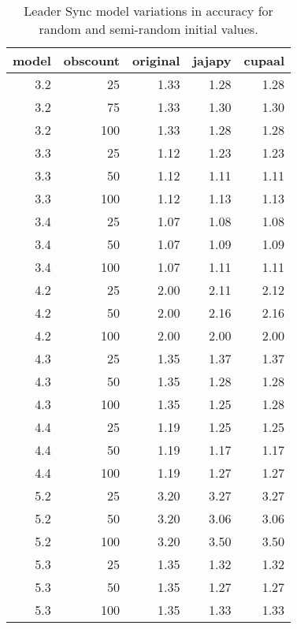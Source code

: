 \begin{table}
    \centering
    \caption{Leader Sync model variations in accuracy for random and semi-random initial values.}
    \label{tab:leader_results_accuracy}
    \begin{tabular}{rrrrr}
        \toprule
        model & obscount & original & jajapy & cupaal \\
        \midrule
        3.2   & 25       & 1.33     & 1.28   & 1.28   \\
        3.2   & 75       & 1.33     & 1.30   & 1.30   \\
        3.2   & 100      & 1.33     & 1.28   & 1.28   \\
        3.3   & 25       & 1.12     & 1.23   & 1.23   \\
        3.3   & 50       & 1.12     & 1.11   & 1.11   \\
        3.3   & 100      & 1.12     & 1.13   & 1.13   \\
        3.4   & 25       & 1.07     & 1.08   & 1.08   \\
        3.4   & 50       & 1.07     & 1.09   & 1.09   \\
        3.4   & 100      & 1.07     & 1.11   & 1.11   \\
        4.2   & 25       & 2.00     & 2.11   & 2.12   \\
        4.2   & 50       & 2.00     & 2.16   & 2.16   \\
        4.2   & 100      & 2.00     & 2.00   & 2.00   \\
        4.3   & 25       & 1.35     & 1.37   & 1.37   \\
        4.3   & 50       & 1.35     & 1.28   & 1.28   \\
        4.3   & 100      & 1.35     & 1.25   & 1.28   \\
        4.4   & 25       & 1.19     & 1.25   & 1.25   \\
        4.4   & 50       & 1.19     & 1.17   & 1.17   \\
        4.4   & 100      & 1.19     & 1.27   & 1.27   \\
        5.2   & 25       & 3.20     & 3.27   & 3.27   \\
        5.2   & 50       & 3.20     & 3.06   & 3.06   \\
        5.2   & 100      & 3.20     & 3.50   & 3.50   \\
        5.3   & 25       & 1.35     & 1.32   & 1.32   \\
        5.3   & 50       & 1.35     & 1.27   & 1.27   \\
        5.3   & 100      & 1.35     & 1.33   & 1.33   \\
        \bottomrule
    \end{tabular}
\end{table}